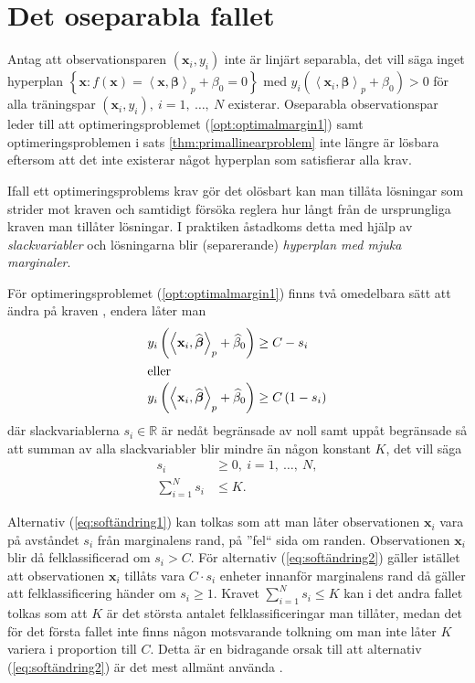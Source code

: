 \documentclass[a4paper, 12pt]{report}
\theoremstyle{definition}
\theoremstyle{remark}
\newcommand{\bfbeta}{{\boldsymbol{\beta}}}
\newcommand{\bfx}{\mathbf{x}}
\newcommand{\llangle}{\left\langle}
\newcommand{\rrangle}{\right\rangle}
\newcommand{\inner}[2]{\llangle #1, #2 \rrangle}
\begin{document}
\section{Det oseparabla fallet}
Antag att observationsparen $\left(\mathbf{x}_i, y_i\right)$ inte är linjärt separabla, det vill säga inget hyperplan $\left\{\mathbf{x} : f\left(\mathbf{x}\right) = \inner{\bfx}{\bfbeta}_p + \beta_0 = 0 \right\}$ med $y_i\left(\inner{\bfx_i}{\bfbeta}_p+\beta_0\right)>0$ för alla träningspar $\left(\mathbf{x}_i, y_i\right),~i=1,~\dots,~N$ existerar. Oseparabla observationspar leder till att optimeringsproblemet (\ref{opt:optimalmargin1}) samt optimeringsproblemen i sats \ref{thm:primallinearproblem} inte längre är lösbara eftersom att det inte existerar något hyperplan som satisfierar alla krav.

Ifall ett optimeringsproblems krav gör det olösbart kan man tillåta lösningar som strider mot kraven och samtidigt försöka reglera hur långt från de ursprungliga kraven man tillåter lösningar. I praktiken åstadkoms detta med hjälp av \emph{slackvariabler} och lösningarna blir (separerande) \emph{hyperplan med mjuka marginaler}.

För optimeringsproblemet (\ref{opt:optimalmargin1}) finns två omedelbara sätt att ändra på kraven \cite{ESL}, endera låter man
\begin{align}
	y_i\left(\inner{\bfx_i}{\widehat{\bfbeta}}_p+\widehat{\beta}_0\right) &\geq C-s_i\label{eq:softändring1}\\
	\intertext{eller}
	y_i\left(\inner{\bfx_i}{\widehat{\bfbeta}}_p+\widehat{\beta}_0\right) &\geq C\left(1-s_i\right)\label{eq:softändring2}
\end{align}
där slackvariablerna $s_i\in\mathbb{R}$ är nedåt begränsade av noll samt uppåt begränsade så att summan av alla slackvariabler blir mindre än någon konstant $K$, det vill säga \begin{equation*}
\begin{aligned}
s_i&\geq0,~i=1,~\dots,~N,\\
\sum_{i=1}^{N}s_i&\leq K.
\end{aligned}
\end{equation*}

Alternativ (\ref{eq:softändring1}) kan tolkas som att man låter observationen $\mathbf{x}_i$ vara på avståndet $s_i$ från marginalens rand, på ''fel`` sida om randen. Observationen $\mathbf{x}_i$ blir då felklassificerad om $s_i>C$. För alternativ (\ref{eq:softändring2}) gäller istället att observationen $\mathbf{x}_i$ tillåts vara $C\cdot s_i$ enheter innanför marginalens rand då gäller att felklassificering händer om $s_i\geq1$. Kravet $\sum_{i=1}^{N} s_i \leq K$ kan i det andra fallet tolkas som att $K$ är det största antalet felklassificeringar man tillåter, medan det för det första fallet inte finns någon motsvarande tolkning om man inte låter $K$ variera i proportion till $C$. Detta är en bidragande orsak till att alternativ (\ref{eq:softändring2}) är det mest allmänt använda \cite{ESL}.
\end{document}

